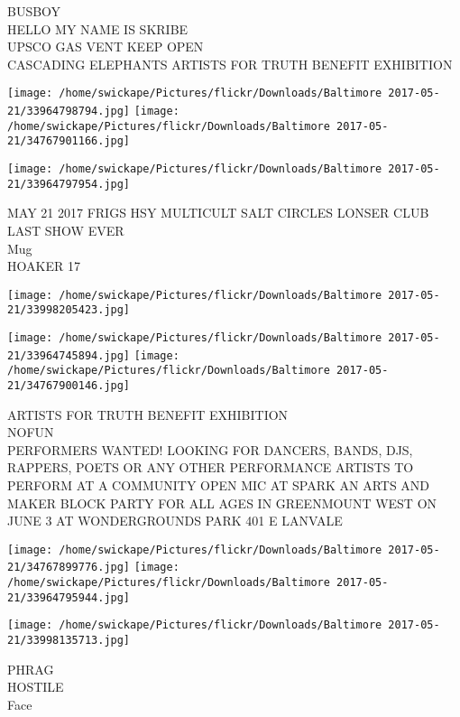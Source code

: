 \documentclass[10pt,letterpaper]{article}
\begin{document}
BUSBOY\\
HELLO MY NAME IS SKRIBE\\
UPSCO GAS VENT KEEP OPEN\\
CASCADING ELEPHANTS ARTISTS FOR TRUTH BENEFIT EXHIBITION\\
\pagebreak

\texttt{[image: /home/swickape/Pictures/flickr/Downloads/Baltimore 2017-05-21/33964798794.jpg]}
\texttt{[image: /home/swickape/Pictures/flickr/Downloads/Baltimore 2017-05-21/34767901166.jpg]}

\vspace{0.25in}
\texttt{[image: /home/swickape/Pictures/flickr/Downloads/Baltimore 2017-05-21/33964797954.jpg]}

MAY 21 2017 FRIGS HSY MULTICULT SALT CIRCLES LONSER CLUB LAST SHOW EVER\\
Mug\\
HOAKER 17\\
\pagebreak

\texttt{[image: /home/swickape/Pictures/flickr/Downloads/Baltimore 2017-05-21/33998205423.jpg]}

\vspace{0.25in}
\texttt{[image: /home/swickape/Pictures/flickr/Downloads/Baltimore 2017-05-21/33964745894.jpg]}
\texttt{[image: /home/swickape/Pictures/flickr/Downloads/Baltimore 2017-05-21/34767900146.jpg]}

ARTISTS FOR TRUTH BENEFIT EXHIBITION\\
NOFUN\\
PERFORMERS WANTED!  LOOKING FOR DANCERS, BANDS, DJS, RAPPERS, POETS OR ANY OTHER PERFORMANCE ARTISTS TO PERFORM AT A COMMUNITY OPEN MIC AT SPARK AN ARTS AND MAKER BLOCK PARTY FOR ALL AGES IN GREENMOUNT WEST ON JUNE 3 AT WONDERGROUNDS PARK 401 E LANVALE\\
\pagebreak

\texttt{[image: /home/swickape/Pictures/flickr/Downloads/Baltimore 2017-05-21/34767899776.jpg]}
\texttt{[image: /home/swickape/Pictures/flickr/Downloads/Baltimore 2017-05-21/33964795944.jpg]}

\vspace{0.25in}
\texttt{[image: /home/swickape/Pictures/flickr/Downloads/Baltimore 2017-05-21/33998135713.jpg]}

PHRAG\\
HOSTILE\\
Face\\
\pagebreak
\end{document}
